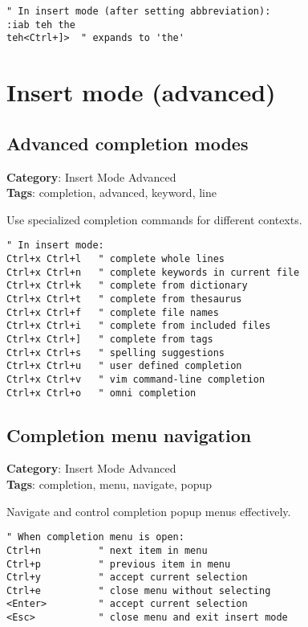 {{{{{{\begin{Exa*}{}
\begin{Verbatim}[fontsize=\footnotesize, breaklines, breakanywhere]
" In insert mode (after setting abbreviation):
:iab teh the
teh<Ctrl+]>  " expands to 'the'
\end{Verbatim}
\end{Exa*}

\chapter{Insert mode (advanced)}
\section{Advanced completion modes}

\textbf{Category}: Insert Mode Advanced\\ \textbf{Tags}: completion, advanced, keyword, line
\vspace{0.5cm}

Use specialized completion commands for different contexts.

\begin{Exa*}{}
\begin{Verbatim}[fontsize=\footnotesize, breaklines, breakanywhere]
" In insert mode:
Ctrl+x Ctrl+l   " complete whole lines
Ctrl+x Ctrl+n   " complete keywords in current file
Ctrl+x Ctrl+k   " complete from dictionary
Ctrl+x Ctrl+t   " complete from thesaurus
Ctrl+x Ctrl+f   " complete file names
Ctrl+x Ctrl+i   " complete from included files
Ctrl+x Ctrl+]   " complete from tags
Ctrl+x Ctrl+s   " spelling suggestions
Ctrl+x Ctrl+u   " user defined completion
Ctrl+x Ctrl+v   " vim command-line completion
Ctrl+x Ctrl+o   " omni completion
\end{Verbatim}
\end{Exa*}

\section{Completion menu navigation}

\textbf{Category}: Insert Mode Advanced\\ \textbf{Tags}: completion, menu, navigate, popup
\vspace{0.5cm}

Navigate and control completion popup menus effectively.

\begin{Exa*}{}
\begin{Verbatim}[fontsize=\footnotesize, breaklines, breakanywhere]
" When completion menu is open:
Ctrl+n          " next item in menu
Ctrl+p          " previous item in menu
Ctrl+y          " accept current selection
Ctrl+e          " close menu without selecting
<Enter>         " accept current selection
<Esc>           " close menu and exit insert mode
\end{Verbatim}
\end{Exa*}

}}}}}}
